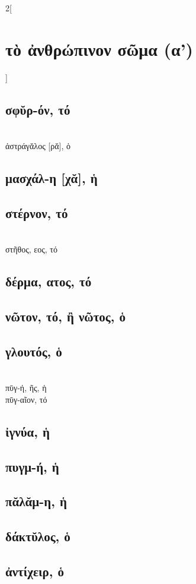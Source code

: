 \documentclass{book}
\begin{document}
\begin{multicols}{2}[\section{τὸ ἀνθρώπινον σῶμα (α')}]
\subsection{σφῠρ-όν, τό}                    ~\\
ἀστράγᾰλος [ρᾰ], ὁ 
\subsection{μασχάλ-η [χᾰ], ἡ}     
\subsection{στέρνον, τό}                    ~\\
στῆθος, εος, τό     
\subsection{δέρμα, ατος, τό}
\subsection{νῶτον, τό, ἢ νῶτος, ὁ}
\subsection{γλουτός, ὁ}           ~\\
πῡγ-ή, ῆς, ἡ \\
πῡγ-αῖον, τό 
\subsection{ἰγνύα, ἡ}
\subsection{πυγμ-ή, ἡ}
\subsection{πᾰλᾰμ-η, ἡ}
\subsection{δάκτῠλος, ὁ}
\subsection{ἀντίχειρ, ὁ}

\end{multicols}
\end{document}
